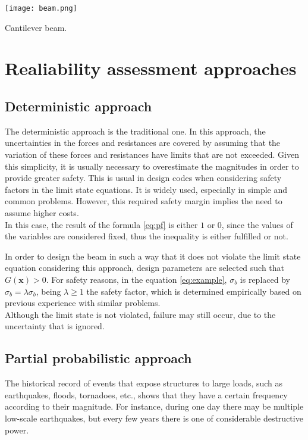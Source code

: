 \begin{marginfigure}[-12\baselineskip]
    \texttt{[image: beam.png]}
    \caption{Cantilever beam.}
    \label{fig:beam}
\end{marginfigure}


\section{Realiability assessment approaches}

\subsection{Deterministic approach}
The deterministic approach is the traditional one. In this approach, the uncertainties
in the forces and resistances are covered by assuming that the variation of these
forces and resistances have limits that are not exceeded. Given this simplicity,
it is usually necessary to overestimate the magnitudes in order to provide greater
safety. This is usual in design codes when considering safety factors in the limit
state equations. It is widely used, especially in simple and common problems.
However, this required safety margin implies the need to assume higher costs. \\

In this case, the result of the formula \ref{eq:pf} is either $1$ or $0$, since the values of the variables are considered fixed, thus the inequality is either fulfilled or not.
\begin{testexample}
In order to design the beam in such a way that it does not violate the limit state equation considering this approach, design parameters are selected such that $G(\bm{x}) > 0$. For safety reasons, in the equation \ref{eq:example}, $\sigma_b$ is replaced by $\hat{\sigma}_b = \lambda \sigma_b$, being $\lambda \geq 1$ the safety factor, which is determined empirically based on previous experience with similar problems. \\

Although the limit state is not violated, failure may still occur, due to the uncertainty that is ignored.
\end{testexample}
\subsection{Partial probabilistic approach}
The historical record of events that expose structures to large loads, such as
earthquakes, floods, tornadoes, etc., shows that they have a certain frequency
according to their magnitude. For instance, during one day there may be multiple
low-scale earthquakes, but every few years there is one of considerable destructive
power. \\

